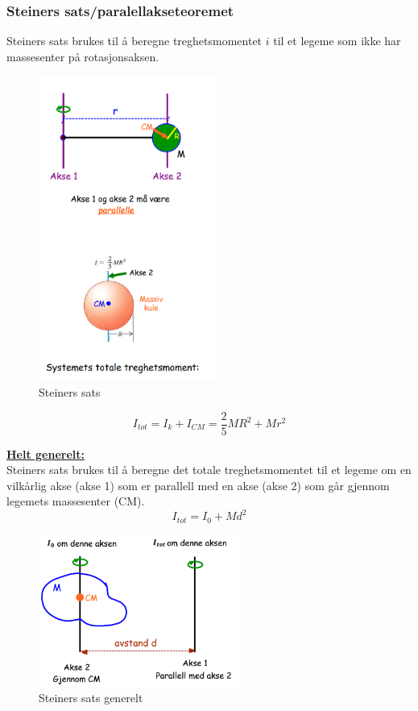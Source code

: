 \documentclass[12pt]{article}
\begin{document}
\subsubsection{Steiners sats/paralellakseteoremet}
Steiners sats brukes til å beregne treghetsmomentet $i$ til et legeme som ikke har massesenter på rotasjonsaksen.
\begin{figure} [H]
    \centering
    \includegraphics[height = 10cm]{images/steiner.png}
    \caption{Steiners sats}
\end{figure}
$$I_{tot} = I_k + I_{CM} = \frac{2}{5}MR^2+Mr^2$$

\underline{\textbf{Helt generelt:}}\\
Steiners sats brukes til å beregne det totale treghetsmomentet til et legeme om en vilkårlig akse (akse 1) som er parallell med en akse (akse 2) som går gjennom legemets massesenter (CM).
$$I_{tot} = I_0 + Md^2$$
\begin{figure} [H]
    \centering
    \includegraphics[height = 5cm]{images/steiner2.png}
    \caption{Steiners sats generelt}
\end{figure}
\end{document}

